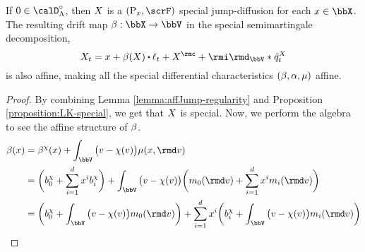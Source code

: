 \begin{proposition}
  \label{proposition:affine-special}
  If $0 \in \odeSpace^\circ$, then $X$ is a $(\Prb_\stateVar, \scrF)$ special jump-diffusion for each $\stateVar \in \stateSpace$.
  The resulting drift map $\affDrift: \stateSpace \rightarrow \vecSpace$ in the special semimartingale decomposition,
  \begin{equation*}
    \X_t = \stateVar + \affDrift(\X) \shortInt \leb_t + \X^\rmc + \id_\vecSpace \ast \compensate{\jumpMeas^\X}_t
  \end{equation*}
  is also affine, making all the special differential characteristics $(\beta, \alpha, \mu)$ affine.
\end{proposition}
\begin{proof}
  \label{proof:proposition:affine-special}
  By combining Lemma \ref{lemma:affJump-regularity} and Proposition \ref{proposition:LK-special}, we get that $X$ is special.
  Now, we perform the algebra to see the affine structure of $\beta$.
  \begin{align*}
    \affDrift(\stateVar) 
    &= \affDrift^\trunc(\stateVar) + \int_\vecSpace \big( \markVar - \trunc(\markVar) \big) \affJump(\stateVar, \rmd\markVar) \\
    &= \bigg( \affDriftPart^\trunc_0 + \sum_{i=1}^d \stateVar^i \affDriftPart^\trunc_i \bigg) + \int_\vecSpace \big(\markVar - \trunc(\markVar)\big) \bigg( \affJumpPart_0(\rmd\markVar) + \sum_{i=1}^d \stateVar^i \affJumpPart_i(\rmd\markVar) \bigg) \\
    &= \bigg( \affDriftPart^\trunc_0 + \int_\vecSpace \big(\markVar - \trunc(\markVar) \big) \affJumpPart_0(\rmd\markVar) \bigg) + \sum_{i=1}^d \stateVar^i \bigg(  \affDriftPart^\trunc_i + \int_\vecSpace \big(\markVar - \trunc(\markVar) \big) \affJumpPart_i(\rmd\markVar) \bigg)
  \end{align*}
\end{proof}
